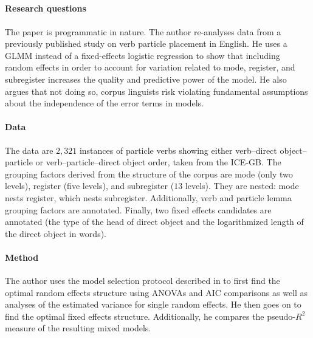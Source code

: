 \documentclass[a4paper,12pt]{article}
\begin{document}
\begin{mdframed}

  \subsection*{\citet{Gries2015}}

  \paragraph{Research questions}
  
  The paper is programmatic in nature.
  The author re-analyses data from a previously published study on verb particle placement in English.
  He uses a GLMM instead of a fixed-effects logistic regression to show that including random effects in order to account for variation related to mode, register, and subregister increases the quality and predictive power of the model.
  He also argues that not doing so, corpus linguists risk violating fundamental assumptions about the independence of the error terms in models.
  
  \paragraph{Data}
  
  The data are $2,321$ instances of particle verbs showing either verb--direct object--particle or verb--particle--direct object order, taken from the ICE-GB.
  The grouping factors derived from the structure of the corpus are mode (only two levels), register (five levels), and subregister ($13$ levels).
  They are nested: mode nests register, which nests subregister.
  Additionally, verb and particle lemma grouping factors are annotated.
  Finally, two fixed effects candidates are annotated (the type of the head of direct object and the logarithmized length of the direct object in words).
  
  \paragraph{Method}
  
  The author uses the model selection protocol described in \citet{ZuurEa2009} to first find the optimal random effects structure using ANOVAs and AIC comparisons as well as analyses of the estimated variance for single random effects.
  He then goes on to find the optimal fixed effects structure.
  Additionally, he compares the pseudo-$R^2$ measure of the resulting mixed models.
  

\end{mdframed}
\end{document}
